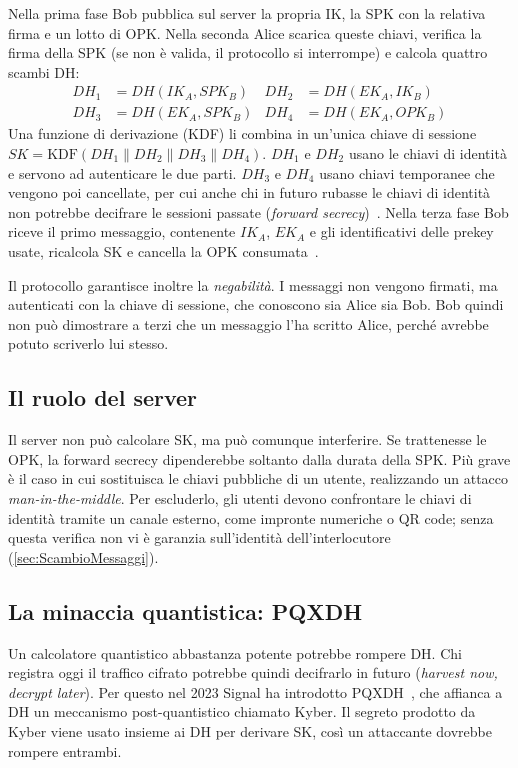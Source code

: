 Nella prima fase Bob pubblica sul server la propria IK, la SPK con la relativa firma
e un lotto di OPK. Nella seconda Alice scarica queste chiavi, verifica la firma della
SPK (se non è valida, il protocollo si interrompe) e calcola quattro scambi DH:
\begin{align*}
  DH_1 &= DH(IK_A, SPK_B) & DH_2 &= DH(EK_A, IK_B)\\
  DH_3 &= DH(EK_A, SPK_B) & DH_4 &= DH(EK_A, OPK_B)
\end{align*}
Una funzione di derivazione (KDF) li combina in un'unica chiave di sessione
$SK = \mathrm{KDF}(DH_1 \| DH_2 \| DH_3 \| DH_4)$.
$DH_1$ e $DH_2$ usano le chiavi di identità e servono ad autenticare le due parti.
$DH_3$ e $DH_4$ usano chiavi temporanee che vengono poi cancellate, per cui anche chi
in futuro rubasse le chiavi di identità non potrebbe decifrare le sessioni passate
(\emph{forward secrecy})~\cite{x3dh}. Nella terza fase Bob riceve il primo
messaggio, contenente $IK_A$, $EK_A$ e gli identificativi delle prekey usate, ricalcola
SK e cancella la OPK consumata~\cite{pqxdh}.

Il protocollo garantisce inoltre la \emph{negabilità}. I messaggi non vengono firmati,
ma autenticati con la chiave di sessione, che conoscono sia Alice sia Bob. Bob quindi
non può dimostrare a terzi che un messaggio l'ha scritto Alice, perché avrebbe potuto
scriverlo lui stesso.

\subsection{Il ruolo del server}\label{sec:server}

Il server non può calcolare SK, ma può comunque interferire. Se trattenesse le OPK, la
forward secrecy dipenderebbe soltanto dalla durata della SPK. Più grave è il caso in
cui sostituisca le chiavi pubbliche di un utente, realizzando un attacco
\emph{man-in-the-middle}. Per escluderlo, gli utenti devono confrontare le chiavi di
identità tramite un canale esterno, come impronte numeriche o QR code; senza questa
verifica non vi è garanzia sull'identità dell'interlocutore (\cref{sec:ScambioMessaggi}).

\subsection{La minaccia quantistica: PQXDH}\label{sec:pqxdh}

Un calcolatore quantistico abbastanza potente potrebbe rompere DH. Chi registra oggi
il traffico cifrato potrebbe quindi decifrarlo in futuro (\emph{harvest now, decrypt
later}). Per questo nel 2023 Signal ha introdotto PQXDH~\cite{signalpqblog}, che
affianca a DH un meccanismo post-quantistico chiamato Kyber. Il segreto prodotto da
Kyber viene usato insieme ai DH per derivare SK, così un attaccante dovrebbe rompere
entrambi.

